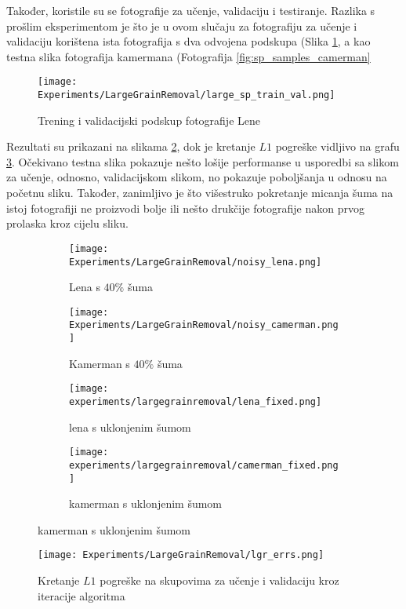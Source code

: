 Također, koristile su se fotografije za učenje, validaciju i testiranje.
Razlika s prošlim eksperimentom je što je u ovom slučaju za fotografiju za učenje i validaciju korištena ista fotografija s dva odvojena podskupa (Slika \ref{fig:large_sp_train_val_illustration}, a kao testna slika fotografija kamermana (Fotografija \ref{fig:sp_samples_camerman}

\begin{figure}
	\centering
	\texttt{[image: Experiments/LargeGrainRemoval/large\_sp\_train\_val.png]}
	\caption{Trening i validacijski podskup fotografije Lene}
	\label{fig:large_sp_train_val_illustration}
\end{figure}

Rezultati su prikazani na slikama \ref{fig:large_sp_result_grid}, dok je kretanje $L1$ pogreške vidljivo na grafu \ref{graph:large_sp_train_val_loss}.
Očekivano testna slika pokazuje nešto lošije performanse u usporedbi sa slikom za učenje, odnosno, validacijskom slikom, no pokazuje poboljšanja u odnosu na početnu sliku.
Također, zanimljivo je što višestruko pokretanje micanja šuma na istoj fotografiji ne proizvodi bolje ili nešto drukčije fotografije nakon prvog prolaska kroz cijelu sliku.

\begin{figure}
	\centering
	\caption{Fotografije lene i fotografa prije i poslije micanja šuma koji prekriva $40\%$ slike}
	\begin{subfigure}[t]{0.35\textwidth}
		\texttt{[image: Experiments/LargeGrainRemoval/noisy\_lena.png]}
		\caption{Lena s $40\%$ šuma}
	\end{subfigure}
	\begin{subfigure}[t]{0.35\textwidth}
		\texttt{[image: Experiments/LargeGrainRemoval/noisy\_camerman.png]}
		\caption{Kamerman s $40\%$ šuma}
	\end{subfigure}
	\begin{subfigure}[t]{0.35\textwidth}
		\texttt{[image: experiments/largegrainremoval/lena\_fixed.png]}
		\caption{lena s uklonjenim šumom}
	\end{subfigure}
	\begin{subfigure}[t]{0.35\textwidth}
		\texttt{[image: experiments/largegrainremoval/camerman\_fixed.png]}
		\caption{kamerman s uklonjenim šumom}
	\end{subfigure}
	\label{fig:large_sp_result_grid}
\end{figure}

\begin{figure}
	\centering
	\texttt{[image: Experiments/LargeGrainRemoval/lgr\_errs.png]}
	\caption{Kretanje $L1$ pogreške na skupovima za učenje i validaciju kroz iteracije algoritma}
	\label{graph:large_sp_train_val_loss}
\end{figure}
